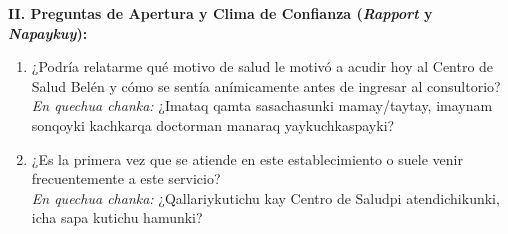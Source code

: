 \vspace{0.3cm}
\noindent\textbf{II. Preguntas de Apertura y Clima de Confianza (\textit{Rapport} y \textit{Napaykuy}):}
\begin{enumerate}
    \item ¿Podría relatarme qué motivo de salud le motivó a acudir hoy al Centro de Salud Belén y cómo se sentía anímicamente antes de ingresar al consultorio?\\
    \textit{En quechua chanka:} ¿Imataq qamta sasachasunki mamay/taytay, imaynam sonqoyki kachkarqa doctorman manaraq yaykuchkaspayki?
    \item ¿Es la primera vez que se atiende en este establecimiento o suele venir frecuentemente a este servicio?\\
    \textit{En quechua chanka:} ¿Qallariykutichu kay Centro de Saludpi atendichikunki, icha sapa kutichu hamunki?
\end{enumerate}

